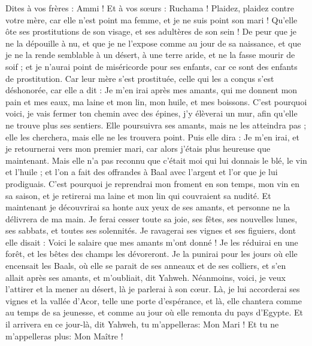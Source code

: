 \begin{multicols}{2}
Dites à vos frères : Ammi ! Et à vos sœurs : Ruchama !
Plaidez, plaidez contre votre mère, car elle n'est point ma femme, et je ne suis point son mari ! Qu'elle ôte ses prostitutions de son visage, et ses adultères de son sein !
De peur que je ne la dépouille à nu, et que je ne l'expose comme au jour de sa naissance, et que je ne la rende semblable à un désert, à une terre aride, et ne la fasse mourir de soif ;
et je n'aurai point de miséricorde pour ses enfants, car ce sont des enfants de prostitution.
Car leur mère s'est prostituée, celle qui les a conçus s'est déshonorée, car elle a dit : Je m'en irai après mes amants, qui me donnent mon pain et mes eaux, ma laine et mon lin, mon huile, et mes boissons.
C'est pourquoi voici, je vais fermer ton chemin avec des épines, j'y élèverai un mur, afin qu'elle ne trouve plus ses sentiers.
Elle poursuivra ses amants, mais ne les atteindra pas ; elle les cherchera, mais elle ne les trouvera point. Puis elle dira : Je m'en irai, et je retournerai vers mon premier mari, car alors j'étais plus heureuse que maintenant.
Mais elle n'a pas reconnu que c'était moi qui lui donnais le blé, le vin et l'huile ; et l'on a fait des offrandes à Baal avec l'argent et l'or que je lui prodiguais.
C'est pourquoi je reprendrai mon froment en son temps, mon vin en sa saison, et je retirerai ma laine et mon lin qui couvraient sa nudité.
Et maintenant je découvrirai sa honte aux yeux de ses amants, et personne ne la délivrera de ma main.
Je ferai cesser toute sa joie, ses fêtes, ses nouvelles lunes, ses sabbats, et toutes ses solennités.
Je ravagerai ses vignes et ses figuiers, dont elle disait : Voici le salaire que mes amants m'ont donné ! Je les réduirai en une forêt, et les bêtes des champs les dévoreront.
Je la punirai pour les jours où elle encensait les Baals, où elle se parait de ses anneaux et de ses colliers, et s'en allait après ses amants, et m'oubliait, dit Yahweh.
Néanmoins, voici, je veux l'attirer et la mener au désert, là je parlerai à son cœur.
Là, je lui accorderai ses vignes et la vallée d'Acor, telle une porte d'espérance, et là, elle chantera comme au temps de sa jeunesse, et comme au jour où elle remonta du pays d'Egypte.
 Et il arrivera en ce jour-là, dit Yahweh, tu m'appelleras: Mon Mari ! Et tu ne m'appelleras plus: Mon Maître !

\end{multicols}
